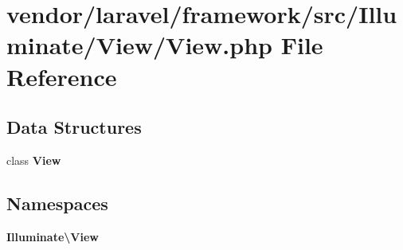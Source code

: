 \section{vendor/laravel/framework/src/\+Illuminate/\+View/\+View.php File Reference}
\label{vendor_2laravel_2framework_2src_2_illuminate_2_view_2view_8php}
\subsection*{Data Structures}
\begin{DoxyCompactItemize}
\item 
class {\bf View}
\end{DoxyCompactItemize}
\subsection*{Namespaces}
\begin{DoxyCompactItemize}
\item 
 {\bf Illuminate\textbackslash{}\+View}
\end{DoxyCompactItemize}
